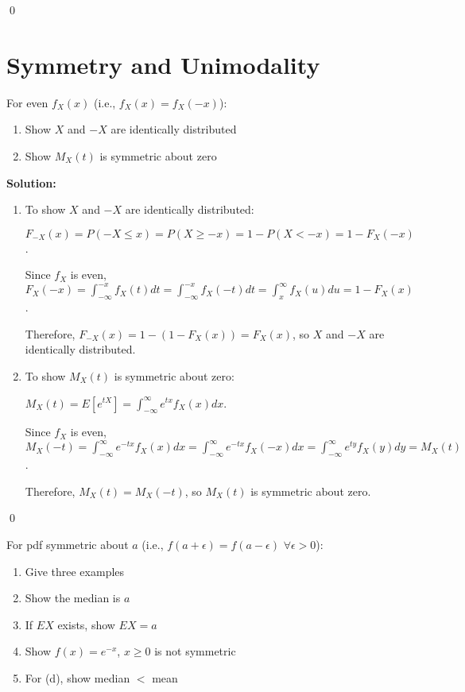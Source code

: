 \qed
\section{Symmetry and Unimodality}

\begin{problembox}
For even $f_X(x)$ (i.e., $f_X(x)=f_X(-x)$):
\begin{enumerate}[label=(\alph*)]
    \item Show $X$ and $-X$ are identically distributed
    \item Show $M_X(t)$ is symmetric about zero
\end{enumerate}
\end{problembox}

\noindent\textbf{Solution:}
\begin{enumerate}[label=(\alph*)]
    \item To show $X$ and $-X$ are identically distributed:
    
    $F_{-X}(x) = P(-X \leq x) = P(X \geq -x) = 1 - P(X < -x) = 1 - F_X(-x)$.
    
    Since $f_X$ is even, $F_X(-x) = \int_{-\infty}^{-x} f_X(t)dt = \int_{-\infty}^{-x} f_X(-t)dt = \int_x^{\infty} f_X(u)du = 1 - F_X(x)$.
    
    Therefore, $F_{-X}(x) = 1 - (1 - F_X(x)) = F_X(x)$, so $X$ and $-X$ are identically distributed.
    
    \item To show $M_X(t)$ is symmetric about zero:
    
    $M_X(t) = E[e^{tX}] = \int_{-\infty}^{\infty} e^{tx}f_X(x)dx$.
    
    Since $f_X$ is even, $M_X(-t) = \int_{-\infty}^{\infty} e^{-tx}f_X(x)dx = \int_{-\infty}^{\infty} e^{-tx}f_X(-x)dx = \int_{-\infty}^{\infty} e^{ty}f_X(y)dy = M_X(t)$.
    
    Therefore, $M_X(t) = M_X(-t)$, so $M_X(t)$ is symmetric about zero.
\end{enumerate}


\qed
\begin{problembox}
For pdf symmetric about $a$ (i.e., $f(a+\epsilon)=f(a-\epsilon)$ $\forall\epsilon>0$):
\begin{enumerate}[label=(\alph*)]
    \item Give three examples
    \item Show the median is $a$
    \item If $EX$ exists, show $EX=a$
    \item Show $f(x)=e^{-x}$, $x\geq0$ is not symmetric
    \item For (d), show median $<$ mean
\end{enumerate}
\end{problembox}

